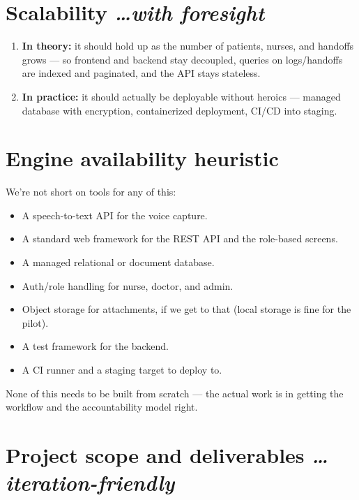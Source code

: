 \documentclass[11pt,a4paper]{article}
\newcommand{\BvrHint}[1]{%
  {\normalfont\normalsize\itshape\hfill #1}}
\begin{document}
\section{Scalability %
\BvrHint{\ldots with foresight}}
\begin{enumerate}[leftmargin=0.7cm]
    \item \textbf{In theory:} it should hold up as the number of patients, nurses, and handoffs grows --- so frontend and backend stay decoupled, queries on logs/handoffs are indexed and paginated, and the API stays stateless.
    \item \textbf{In practice:} it should actually be deployable without heroics --- managed database with encryption, containerized deployment, CI/CD into staging.
\end{enumerate}

\section{Engine availability heuristic}
We're not short on tools for any of this:
\begin{itemize}[leftmargin=0.7cm]
    \item A speech-to-text API for the voice capture.
    \item A standard web framework for the REST API and the role-based screens.
    \item A managed relational or document database.
    \item Auth/role handling for nurse, doctor, and admin.
    \item Object storage for attachments, if we get to that (local storage is fine for the pilot).
    \item A test framework for the backend.
    \item A CI runner and a staging target to deploy to.
\end{itemize}
None of this needs to be built from scratch --- the actual
work is in getting the workflow and the accountability model
right.

\section{Project scope and deliverables %
\BvrHint{\ldots iteration-friendly}}
\end{document}
